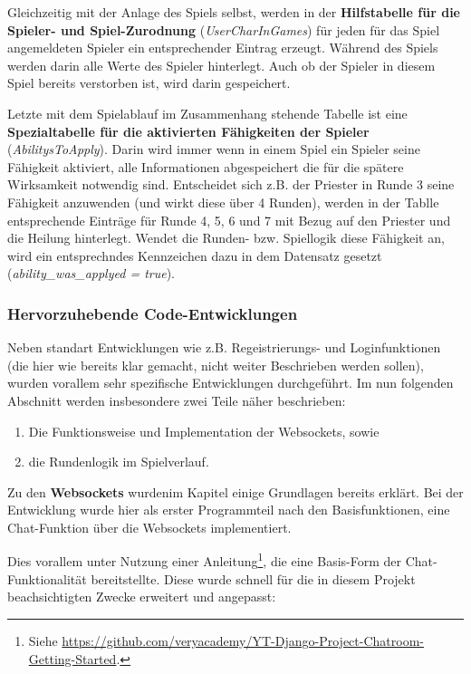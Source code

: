 Gleichzeitig mit der Anlage des Spiels selbst, werden in der \textbf{Hilfstabelle für die Spieler- und Spiel-Zurodnung} (\textit{UserCharInGames}) für jeden für das Spiel angemeldeten Spieler ein entsprechender Eintrag erzeugt. Während des Spiels werden darin alle Werte des Spieler hinterlegt. Auch ob der Spieler in diesem Spiel bereits verstorben ist, wird darin gespeichert. 

Letzte mit dem Spielablauf im Zusammenhang stehende Tabelle ist eine \textbf{Spezialtabelle für die aktivierten Fähigkeiten der Spieler} (\textit{AbilitysToApply}). Darin wird immer wenn in einem Spiel ein Spieler seine Fähigkeit aktiviert, alle Informationen abgespeichert die für die spätere Wirksamkeit notwendig sind. Entscheidet sich z.B. der Priester in Runde 3 seine Fähigkeit anzuwenden (und wirkt diese über 4 Runden), werden in der Tablle entsprechende Einträge für Runde 4, 5, 6 und 7 mit Bezug auf den Priester und die Heilung hinterlegt. Wendet die Runden- bzw. Spiellogik diese Fähigkeit an, wird ein entsprechndes Kennzeichen dazu in dem Datensatz gesetzt (\textit{ability\_was\_applyed = true}).





\subsubsection{Hervorzuhebende Code-Entwicklungen}


Neben standart Entwicklungen wie z.B. Regeistrierungs- und Loginfunktionen (die hier wie bereits klar gemacht, nicht weiter Beschrieben werden sollen), wurden vorallem sehr spezifische Entwicklungen durchgeführt. Im nun folgenden Abschnitt werden insbesondere zwei Teile näher beschrieben: 

\begin{enumerate}
    \item Die Funktionsweise und Implementation der Websockets, sowie 
    \item die Rundenlogik im Spielverlauf.
\end{enumerate}



Zu den \textbf{Websockets} wurdenim Kapitel  einige Grundlagen bereits erklärt. Bei der Entwicklung wurde hier als erster Programmteil nach den Basisfunktionen, eine Chat-Funktion über die Websockets implementiert. 


Dies vorallem unter Nutzung einer Anleitung\footnote{Siehe \url{https://github.com/veryacademy/YT-Django-Project-Chatroom-Getting-Started}.}, die eine Basis-Form der Chat-Funktionalität bereitstellte. Diese wurde schnell für die in diesem Projekt beachsichtigten Zwecke erweitert und angepasst:

